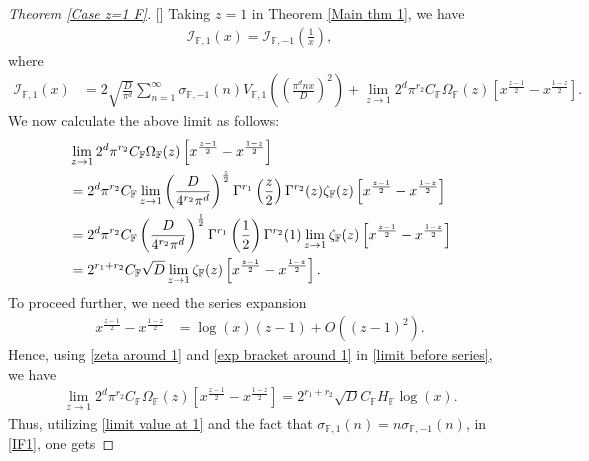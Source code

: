 \documentclass[12pt,reqno]{amsart}
\renewcommand{\(}{\left\(}
\renewcommand{\)}{\right\)}
\renewcommand{\[}{\left\[}
\renewcommand{\]}{\right\]}
\numberwithin{equation}{section}
\theoremstyle{plain}
\begin{document}
\begin{proof}[Theorem \rm{\ref{Case z=1 F}}][]
Taking $z=1$ in Theorem \ref{Main thm 1}, we have
\begin{align*}
\mathcal{I}_{\mathbb{F}, 1}(x) = \mathcal{I}_{\mathbb{F}, -1}\left(\frac{1}{x}\right),
\end{align*}
where
\begin{align}
\mathcal{I}_{\mathbb{F}, 1}(x) &= 2\sqrt{\frac{D}{\pi^d}}\sum_{n=1}^{\infty}\sigma_{\mathbb{F}, -1}(n)V_{\mathbb{F}, 1}\left(\left(\frac{\pi^{d} n x}{D}\right)^2\right) + \lim_{z \rightarrow 1}2^d\pi^{r_2}C_{\mathbb{F}}\Omega_{\mathbb{F}}(z)\left[x^{\frac{z-1}{2}} - x^{\frac{1-z}{2}}\right]. \label{IF1}
\end{align}
We now calculate the above limit as follows:
{\allowdisplaybreaks
\begin{align}
&\lim_{z \rightarrow 1}2^d\pi^{r_2}C_{\mathbb{F}}\Omega_{\mathbb{F}}(z)\left[x^{\frac{z-1}{2}} - x^{\frac{1-z}{2}}\right] \notag \\
&= 2^d\pi^{r_2}C_{\mathbb{F}}\lim_{z \rightarrow 1}\left(\frac{D}{4^{r_2}\pi^d}\right)^{\frac{z}{2}}\Gamma^{r_1}\left(\frac{z}{2}\right)\Gamma^{r_2}(z)\zeta_{\mathbb{F}}(z)\left[x^{\frac{z-1}{2}} - x^{\frac{1-z}{2}}\right] \notag\\
&= 2^d\pi^{r_2}C_{\mathbb{F}}\left(\frac{D}{4^{r_2}\pi^d}\right)^{\frac{1}{2}}\Gamma^{r_1}\left(\frac{1}{2}\right)\Gamma^{r_2}(1)\lim_{z \rightarrow 1}\zeta_{\mathbb{F}}(z)\left[x^{\frac{z-1}{2}} - x^{\frac{1-z}{2}}\right] \notag\\
&= 2^{r_1+r_2}C_{\mathbb{F}}\sqrt{D}\lim_{z \rightarrow 1}\zeta_{\mathbb{F}}(z)\left[x^{\frac{z-1}{2}} - x^{\frac{1-z}{2}}\right]. \label{limit before series}
\end{align}}
To proceed further, we need the series expansion
\begin{align}\label{exp bracket around 1}
x^{\frac{z-1}{2}} - x^{\frac{1-z}{2}} &= \log(x)(z-1) + O((z-1)^2).
\end{align}
Hence, using \eqref{zeta around 1} and \eqref{exp bracket around 1} in \eqref{limit before series}, we have
\begin{align}
\lim_{z \rightarrow 1}2^d\pi^{r_2}C_{\mathbb{F}}\Omega_{\mathbb{F}}(z)\left[x^{\frac{z-1}{2}} - x^{\frac{1-z}{2}}\right] = 2^{r_1+r_2}\sqrt{D}C_{\mathbb{F}}H_{\mathbb{F}}\log(x). \label{limit value at 1}
\end{align}
Thus, utilizing \eqref{limit value at 1} and the fact that $\sigma_{\mathbb{F}, 1}(n) = n\sigma_{\mathbb{F}, -1}(n)$, in \eqref{IF1}, one gets

\end{proof}
\end{document}
